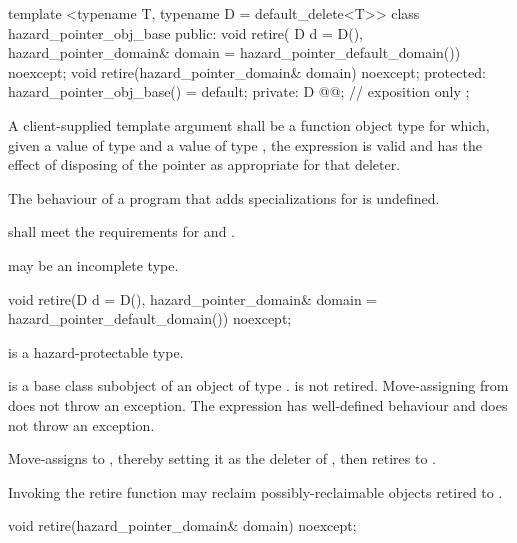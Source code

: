 \begin{codeblock}
template <typename T, typename D = default_delete<T>>
class hazard_pointer_obj_base {
public:
  void retire(
    D d = D(),
    hazard_pointer_domain& domain = hazard_pointer_default_domain()) noexcept;
  void retire(hazard_pointer_domain& domain) noexcept;
protected:
  hazard_pointer_obj_base() = default;
private:
  D @@; // exposition only
};
\end{codeblock}

A client-supplied template argument  shall be a function object type %
for which, given a value  of type  and a value  of type , the expression  is valid and has the effect of disposing of the pointer as appropriate for that deleter.

The behaviour of a program that adds specializations for  is undefined.

{} shall meet the requirements for  and .

{} may be an incomplete type.

\begin{itemdecl}
void retire(D d = D(), hazard_pointer_domain& domain = hazard_pointer_default_domain()) noexcept;
\end{itemdecl}

\begin{itemdescr}

\mandates
{} is a hazard-protectable type.

\expects
{} is a base class subobject of an object  of type .  is not retired.
Move-assigning  from  does not throw an exception. The expression  has well-defined behaviour and does not throw an exception.

\effects 
Move-assigns  to , thereby setting it as the deleter of , then retires 
to .

Invoking the retire function may reclaim possibly-reclaimable objects retired to .

\end{itemdescr}

\begin{itemdecl}
void retire(hazard_pointer_domain& domain) noexcept;
\end{itemdecl}

